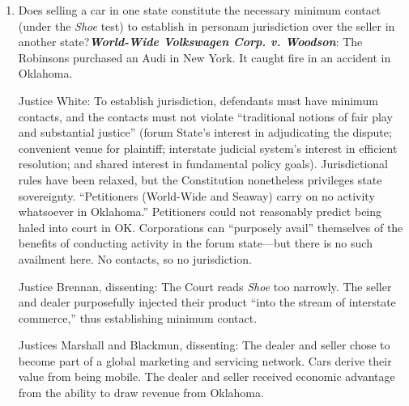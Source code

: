 \begin{enumerate}
    \item Does selling a car in one state constitute the necessary minimum contact (under the \emph{Shoe} test) to establish in personam jurisdiction over the seller in another state?\textbf{\emph{World-Wide Volkswagen Corp. v. Woodson}}: The Robinsons purchased an Audi in New York. It caught fire in an accident in Oklahoma.    

    Justice White: To establish jurisdiction, defendants must have minimum contacts, and the contacts must not violate ``traditional notions of fair play and substantial justice'' (forum State's interest in adjudicating the dispute; convenient venue for plaintiff; interstate judicial system's interest in efficient resolution; and shared interest in fundamental policy goals). Jurisdictional rules have been relaxed, but the Constitution nonetheless privileges state sovereignty. ``Petitioners (World-Wide and Seaway) carry on no activity whatsoever in Oklahoma.'' Petitioners could not reasonably predict being haled into court in OK. Corporations can ``purposely avail'' themselves of the benefits of conducting activity in the forum state---but there is no such availment here. No contacts, so no jurisdiction.

    Justice Brennan, dissenting: The Court reads \emph{Shoe} too narrowly. The seller and dealer purposefully injected their product ``into the stream of interstate commerce,'' thus establishing minimum contact.

    Justices Marshall and Blackmun, dissenting: The dealer and seller chose to become part of a global marketing and servicing network. Cars derive their value from being mobile. The dealer and seller received economic advantage from the ability to draw revenue from Oklahoma.


\end{enumerate}
